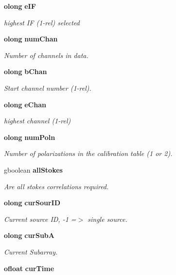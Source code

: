 \begin{CompactItemize}
{\bf olong} {\bf e\-IF}
\begin{CompactList}\small\item\em highest IF (1-rel) selected \item\end{CompactList}\item 
{\bf olong} {\bf num\-Chan}
\begin{CompactList}\small\item\em Number of channels in data. \item\end{CompactList}\item 
{\bf olong} {\bf b\-Chan}
\begin{CompactList}\small\item\em Start channel number (1-rel). \item\end{CompactList}\item 
{\bf olong} {\bf e\-Chan}
\begin{CompactList}\small\item\em highest channel (1-rel) \item\end{CompactList}\item 
{\bf olong} {\bf num\-Poln}
\begin{CompactList}\small\item\em Number of polarizations in the calibration table (1 or 2). \item\end{CompactList}\item 
gboolean {\bf all\-Stokes}
\begin{CompactList}\small\item\em Are all stokes correlations required. \item\end{CompactList}\item 
{\bf olong} {\bf cur\-Sour\-ID}
\begin{CompactList}\small\item\em Current source ID, -1 =$>$ single source. \item\end{CompactList}\item 
{\bf olong} {\bf cur\-Sub\-A}
\begin{CompactList}\small\item\em Current Subarray. \item\end{CompactList}\item 
{\bf ofloat} {\bf cur\-Time}

\end{CompactItemize}
